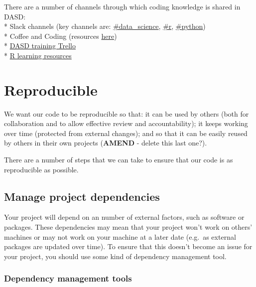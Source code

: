 \documentclass[]{book}
\begin{document}
There are a number of channels through which coding knowledge is shared in DASD:\\
* Slack channels (key channels are: \href{https://app.slack.com/client/T1PU1AP6D/C1Z8Q18LS}{\#data\_science}, \href{https://app.slack.com/client/T1PU1AP6D/C1PUCG719}{\#r}, \href{https://app.slack.com/client/T1PU1AP6D/C1Q09V86S}{\#python})\\
* Coffee and Coding (resources \href{https://github.com/moj-analytical-services/Coffee-and-Coding}{here})\\
* \href{https://trello.com/b/zAwm6sCc/dasd-training}{DASD training Trello}\\
* \href{https://docs.google.com/document/d/1R4hBMf26T9HEnCdVz56PpZhwiCv5RhberYL3BxOSKsA/edit}{R learning resources}

\hypertarget{reproduce}{%
\chapter{Reproducible}\label{reproduce}}

We want our code to be reproducible so that: it can be used by others (both for collaboration and to allow effective review and accountability); it keeps working over time (protected from external changes); and so that it can be easily reused by others in their own projects (\textbf{AMEND} - delete this last one?).

There are a number of steps that we can take to ensure that our code is as reproducible as possible.

\hypertarget{projdep}{%
\section{Manage project dependencies}\label{projdep}}

Your project will depend on an number of external factors, such as software or packages. These dependencies may mean that your project won't work on others' machines or may not work on your machine at a later date (e.g.~as external packages are updated over time). To ensure that this doesn't become an issue for your project, you should use some kind of dependency management tool.

\hypertarget{dependency-management-tools}{%
\subsection*{Dependency management tools}\label{dependency-management-tools}}
\end{document}
